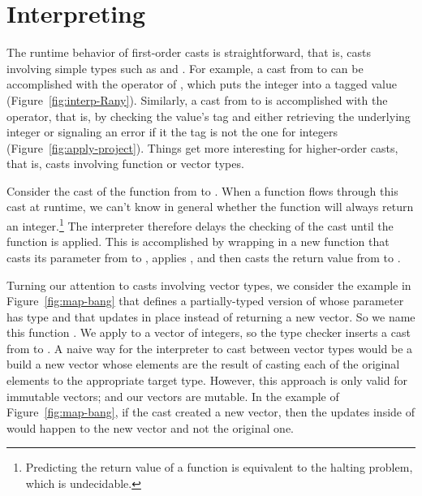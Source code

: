 \documentclass[7x10,nocrop]{TimesAPriori_MIT}%
\begin{document}
\clearpage

\section{Interpreting \LangCast{}}
\label{sec:interp-casts}

The runtime behavior of first-order casts is straightforward, that is,
casts involving simple types such as  and
.  For example, a cast from  to 
can be accomplished with the  operator of \LangAny{}, which
puts the integer into a tagged value
(Figure~\ref{fig:interp-Rany}). Similarly, a cast from  to
 is accomplished with the  operator, that
is, by checking the value's tag and either retrieving the underlying
integer or signaling an error if it the tag is not the one for
integers (Figure~\ref{fig:apply-project}).
%
Things get more interesting for higher-order casts, that is, casts
involving function or vector types.

Consider the cast of the function  from  to . When a function flows through
this cast at runtime, we can't know in general whether the function
will always return an integer.\footnote{Predicting the return value of
  a function is equivalent to the halting problem, which is
  undecidable.}  The \LangCast{} interpreter therefore delays the checking
of the cast until the function is applied. This is accomplished by
wrapping  in a new function that casts its parameter
from  to , applies , and then
casts the return value from  to .

Turning our attention to casts involving vector types, we consider the
example in Figure~\ref{fig:map-bang} that defines a
partially-typed version of  whose parameter  has
type  and that updates  in place
instead of returning a new vector. So we name this function
. We apply  to a vector of integers, so
the type checker inserts a cast from 
to . A naive way for the \LangCast{} interpreter to
cast between vector types would be a build a new vector whose elements
are the result of casting each of the original elements to the
appropriate target type. However, this approach is only valid for
immutable vectors; and our vectors are mutable. In the example of
Figure~\ref{fig:map-bang}, if the cast created a new vector, then
the updates inside of  would happen to the new vector
and not the original one.
\end{document}
